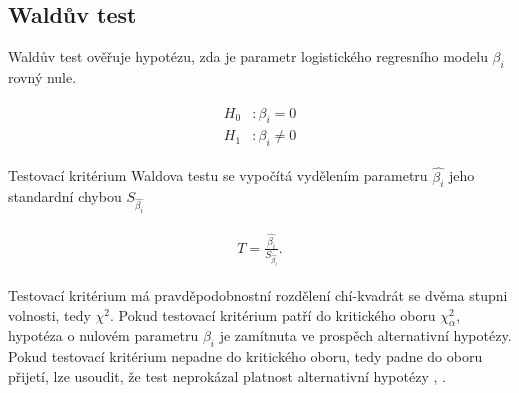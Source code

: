\subsection{Waldův test}
Waldův test ověřuje hypotézu, zda je parametr logistického regresního modelu $\beta_i$ rovný nule.

\begin{align}
    \begin{split}
        H_0 &: \beta_i = 0 \\
        H_1 &: \beta_i \neq 0
    \end{split}
\end{align}

Testovací kritérium Waldova testu se vypočítá vydělením parametru $\hat{\beta_i}$ jeho standardní chybou $S_{\hat{\beta_i}}$

\begin{align}
    \begin{split}
        T = \frac{\hat{\beta_i}}{S_{\hat{\beta_i}}}.
    \end{split}
\end{align}

Testovací kritérium má pravděpodobnostní rozdělení chí-kvadrát se dvěma stupni volnosti, tedy $\chi^2$. Pokud testovací kritérium patří do 
kritického oboru $\chi^2_\alpha$, hypotéza o nulovém parametru $\beta_i$ je zamítnuta ve prospěch alternativní hypotézy. Pokud testovací kritérium nepadne do kritického oboru,
tedy padne do oboru přijetí, lze usoudit, že test neprokázal platnost alternativní hypotézy \cite{kleinbaum_logistic_2010}, \cite{powers_statistical_2000}.